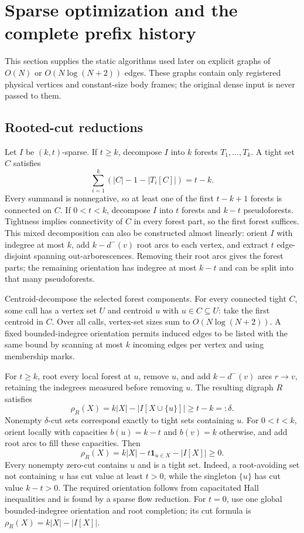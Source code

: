 \documentclass[11pt,a4paper]{article}
\theoremstyle{definition}
\theoremstyle{remark}
\newcommand{\indeg}{d^-}
\begin{document}
\section{Sparse optimization and the complete prefix history}
\label{sec:sparse}

This section supplies the static algorithms used later on
explicit graphs of $O(N)$ or $O(N\log(N+2))$ edges. These graphs
contain only registered physical vertices and constant-size
body frames; the original dense input is never passed to them.

\subsection{Rooted-cut reductions}

Let $I$ be $(k,t)$-sparse. If $t\geq k$, decompose $I$ into
$k$ forests $T_1,\ldots,T_k$. A tight set $C$ satisfies
\[
 \sum_{i=1}^k (|C|-1-|T_i[C]|)=t-k.
\]
Every summand is nonnegative, so at least one of the first
$t-k+1$ forests is connected on $C$.
If $0<t<k$, decompose $I$ into $t$ forests and $k-t$
pseudoforests. Tightness implies connectivity of $C$ in
every forest part, so the first forest suffices.
This mixed decomposition can also be constructed almost linearly:
orient $I$ with indegree at most $k$, add $k-\indeg(v)$ root
arcs to each vertex, and extract $t$ edge-disjoint spanning
out-arborescences. Removing their root arcs gives the forest
parts; the remaining orientation has indegree at most $k-t$
and can be split into that many pseudoforests.

Centroid-decompose the selected forest components. For every
connected tight $C$, some call has a vertex set $U$ and centroid
$u$ with $u\in C\subseteq U$: take the first centroid in $C$.
Over all calls, vertex-set sizes sum to $O(N\log(N+2))$.
A fixed bounded-indegree orientation permits induced edges
to be listed with the same bound by scanning at most $k$
incoming edges per vertex and using membership marks.

For $t\geq k$, root every local forest at $u$, remove $u$, and
add $k-\indeg(v)$ arcs $r\to v$, retaining the indegrees
measured before removing $u$. The resulting digraph $R$ satisfies
\begin{equation}\label{eq:upper-root}
 \rho_R(X)=k|X|-|I[X\cup\{u\}]|\geq t-k=:\delta.
\end{equation}
Nonempty $\delta$-cut sets correspond exactly to tight sets
containing $u$.
For $0<t<k$, orient locally with capacities
$b(u)=k-t$ and $b(v)=k$ otherwise, and add root arcs to fill
these capacities. Then
\begin{equation}\label{eq:lower-root}
 \rho_R(X)=k|X|-t\mathbf1_{u\in X}-|I[X]|\geq0.
\end{equation}
Every nonempty zero-cut contains $u$ and is a tight set.
Indeed, a root-avoiding set not containing $u$ has cut value at
least $t>0$, while the singleton $\{u\}$ has cut value $k-t>0$.
The required orientation follows from capacitated Hall
inequalities and is found by a sparse flow reduction.
For $t=0$, use one global bounded-indegree orientation and
root completion; its cut formula is
$\rho_R(X)=k|X|-|I[X]|$.
\end{document}
